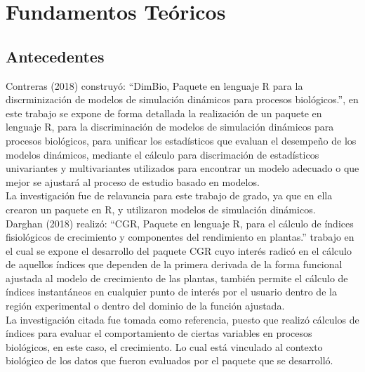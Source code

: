 \chapter{Fundamentos Te\'oricos}

\section{Antecedentes}

Contreras (2018)  construy\'o: “DimBio, Paquete en lenguaje R para la discrminizaci\'on de modelos de simulaci\'on din\'amicos para procesos biol\'ogicos.”, en este trabajo se expone de forma detallada la realizaci\'on de un paquete en lenguaje R, para la discriminaci\'on de modelos de simulaci\'on din\'amicos para procesos biol\'ogicos, para unificar los estad\'isticos que evaluan el desempeño de los modelos din\'amicos, mediante el c\'alculo para discrimaci\'on de estad\'isticos univariantes y multivariantes utilizados para encontrar un modelo adecuado o que mejor se ajustar\'a al proceso de estudio basado en modelos.\\ 

La investigaci\'on fue de relavancia para este trabajo de grado, ya que en ella crearon un paquete en R, y utilizaron modelos de simulaci\'on din\'amicos.\\

Darghan (2018) realiz\'o: “CGR, Paquete en lenguaje R, para el cálculo de índices fisiológicos de crecimiento y componentes del rendimiento en plantas.” trabajo en el cual se expone el desarrollo del paquete CGR cuyo interés radicó en el cálculo de aquellos índices que dependen de la primera derivada de la forma funcional ajustada al modelo de crecimiento de las plantas, también permite el cálculo de índices instantáneos en cualquier punto de interés por el usuario dentro de la región experimental o dentro del dominio de la función ajustada.\\

La investigaci\'on citada fue tomada como referencia, puesto que realizó cálculos de índices para evaluar el comportamiento de ciertas variables en procesos biol\'ogicos, en este caso, el crecimiento. Lo cual est\'a vinculado al contexto biol\'ogico de los datos que fueron evaluados por el paquete que se desarroll\'o.\\

